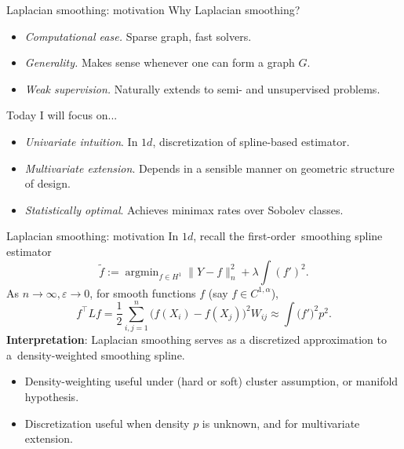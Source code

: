 \documentclass[xcolor=dvipsnames]{beamer}
\DeclareMathOperator*{\argmin}{argmin}
\begin{document}
\begin{frame}{Laplacian smoothing: motivation}
Why Laplacian smoothing?
\begin{itemize}
	\item \emph{Computational ease.} Sparse graph, fast solvers.
	\item \emph{Generality.} Makes sense whenever one can form a graph $G$. 
	\item \emph{Weak supervision.} Naturally extends to semi- and unsupervised problems.
\end{itemize}
\pause
Today I will focus on...
\begin{itemize}
	\item \emph{Univariate intuition}. In $1d$, discretization of spline-based estimator.
	\item \emph{Multivariate extension}. Depends in a sensible manner on geometric structure of design.
	\item \emph{Statistically optimal}. Achieves minimax rates over Sobolev classes.
\end{itemize}
\end{frame}

\begin{frame}[t]{Laplacian smoothing: motivation}
In $1d$, recall the first-order~\alert{smoothing spline} estimator
\begin{equation*}
\widetilde{f} := \argmin_{f \in H^1} \|Y - f\|_n^2 + \lambda \int (f')^2.
\end{equation*}
\pause
As $n \to \infty, \varepsilon \to 0$, for smooth functions $f$ (say $f \in C^{1,\alpha}$), 
\begin{equation*}
f^{\top} L f = \frac{1}{2}\sum_{i,j = 1}^{n} \bigl(f(X_i) - f(X_j)\bigr)^2 W_{ij} \approx \int \bigl(f')^2 p^2 .
\end{equation*}
\pause
{\bf Interpretation}: Laplacian smoothing serves as a \alert{discretized} approximation to a~\alert{density-weighted} smoothing spline. 
\begin{itemize}
	\item Density-weighting useful under (hard or soft) cluster assumption, or manifold hypothesis.
	\item Discretization useful when density $p$ is unknown, and for multivariate extension.
\end{itemize}
\end{frame}
\end{document}
